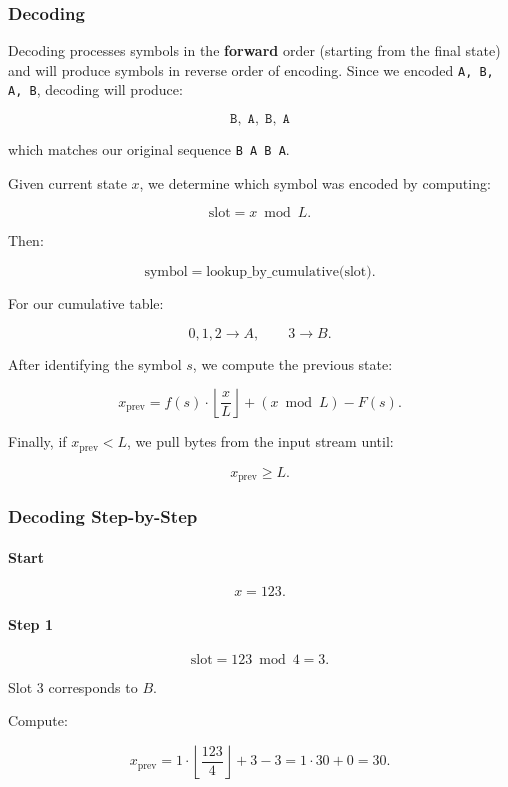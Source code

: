 \subsubsection{Decoding}

Decoding processes symbols in the \textbf{forward} order (starting from the final state) and will produce symbols in reverse order of encoding. Since we encoded \texttt{A, B, A, B}, decoding will produce:

\[
\texttt{B},\; \texttt{A},\; \texttt{B},\; \texttt{A}
\]

which matches our original sequence \texttt{B A B A}.

Given current state $x$, we determine which symbol was encoded by computing:

\[
\text{slot} = x \bmod L.
\]

Then:

\[
\text{symbol} = \text{lookup\_by\_cumulative(slot)}.
\]

For our cumulative table:

\[
0,1,2 \rightarrow A,\qquad 3 \rightarrow B.
\]

After identifying the symbol $s$, we compute the previous state:

\[
x_{\text{prev}} = f(s) \cdot \left\lfloor \frac{x}{L} \right\rfloor + (x \bmod L) - F(s).
\]

Finally, if $x_{\text{prev}} < L$, we pull bytes from the input stream until:

\[
x_{\text{prev}} \geq L.
\]

\subsubsection{Decoding Step-by-Step}

\paragraph{Start}

\[
x = 123.
\]

\paragraph{Step 1}

\[
\text{slot} = 123 \bmod 4 = 3.
\]

Slot 3 corresponds to $B$.

Compute:

\[
x_{\text{prev}} = 1 \cdot \left\lfloor \frac{123}{4} \right\rfloor + 3 - 3
= 1 \cdot 30 + 0 = 30.
\]

